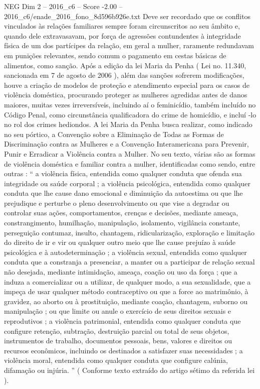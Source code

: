 \begin{textsample}{NEG Dim 2 – 2016\_c6 – Score -2.00 – 2016\_c6/enade\_2016\_fono\_8d596b926e.txt}
Deve ser recordado que os conflitos vinculados às relações familiares sempre foram circunscritos ao seu âmbito e, quando dele extravasavam, por força de agressões contundentes à integridade física de um dos partícipes da relação, em geral a mulher, raramente redundavam em punições relevantes, sendo comum o pagamento em cestas básicas de alimentos, como sanção.
Após a edição da lei Maria da Penha ( Lei no. 11.340, sancionada em 7 de agosto de 2006 ), além das sanções sofrerem modificações, houve a criação de modelos de proteção e atendimento especial para os casos de violência doméstica, procurando proteger as mulheres agredidas antes de danos maiores, muitas vezes irreversíveis, incluindo aí o feminicídio, também incluído no Código Penal, como circunstância qualificadora do crime de homicídio, e incluí -lo no rol dos crimes hediondos.
A lei Maria da Penha busca realizar, como indicado no seu pórtico, a Convenção sobre a Eliminação de Todas as Formas de Discriminação contra as Mulheres e a Convenção Interamericana para Prevenir, Punir e Erradicar a Violência contra a Mulher.
No seu texto, várias são as formas de violência doméstica e familiar contra a mulher, identificadas como sendo, entre outras : “ a violência física, entendida como qualquer conduta que ofenda sua integridade ou saúde corporal ; a violência psicológica, entendida como qualquer conduta que lhe cause dano emocional e diminuição da autoestima ou que lhe prejudique e perturbe o pleno desenvolvimento ou que vise a degradar ou controlar suas ações, comportamentos, crenças e decisões, mediante ameaça, constrangimento, humilhação, manipulação, isolamento, vigilância constante, perseguição contumaz, insulto, chantagem, ridicularização, exploração e limitação do direito de ir e vir ou qualquer outro meio que lhe cause prejuízo à saúde psicológica e à autodeterminação ; a violência sexual, entendida como qualquer conduta que a constranja a presenciar, a manter ou a participar de relação sexual não desejada, mediante intimidação, ameaça, coação ou uso da força ; que a induza a comercializar ou a utilizar, de qualquer modo, a sua sexualidade, que a impeça de usar qualquer método contraceptivo ou que a force ao matrimônio, à gravidez, ao aborto ou à prostituição, mediante coação, chantagem, suborno ou manipulação ; ou que limite ou anule o exercício de seus direitos sexuais e reprodutivos ; a violência patrimonial, entendida como qualquer conduta que configure retenção, subtração, destruição parcial ou total de seus objetos, instrumentos de trabalho, documentos pessoais, bens, valores e direitos ou recursos econômicos, incluindo os destinados a satisfazer suas necessidades ; a violência moral, entendida como qualquer conduta que configure calúnia, difamação ou injúria. ” ( Conforme texto extraído do artigo sétimo da referida lei ).

\end{textsample}

